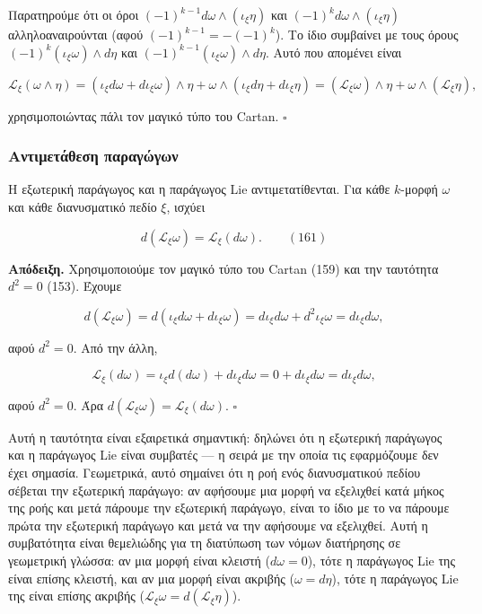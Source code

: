 \documentclass[12pt]{article}
\begin{document}
Παρατηρούμε ότι οι όροι $(-1)^{k-1} d\omega \wedge (\iota_\xi \eta)$ και $(-1)^k d\omega \wedge (\iota_\xi \eta)$ αλληλοαναιρούνται (αφού $(-1)^{k-1} = -(-1)^k$). Το ίδιο συμβαίνει με τους όρους $(-1)^k (\iota_\xi \omega) \wedge d\eta$ και $(-1)^{k-1} (\iota_\xi \omega) \wedge d\eta$. Αυτό που απομένει είναι

\[
\mathcal{L}_\xi (\omega \wedge \eta) = (\iota_\xi d\omega + d\iota_\xi \omega) \wedge \eta + \omega \wedge (\iota_\xi d\eta + d\iota_\xi \eta) = (\mathcal{L}_\xi \omega) \wedge \eta + \omega \wedge (\mathcal{L}_\xi \eta),
\]

χρησιμοποιώντας πάλι τον μαγικό τύπο του Cartan. $\square$

\subsubsection{Αντιμετάθεση παραγώγων}

Η εξωτερική παράγωγος και η παράγωγος Lie αντιμετατίθενται. Για κάθε $k$-μορφή $\omega$ και κάθε διανυσματικό πεδίο $\xi$, ισχύει

\[
d(\mathcal{L}_\xi \omega) = \mathcal{L}_\xi (d\omega). \qquad (161)
\]

\textbf{Απόδειξη.} Χρησιμοποιούμε τον μαγικό τύπο του Cartan (159) και την ταυτότητα $d^2 = 0$ (153). Έχουμε

\[
d(\mathcal{L}_\xi \omega) = d(\iota_\xi d\omega + d\iota_\xi \omega) = d\iota_\xi d\omega + d^2 \iota_\xi \omega = d\iota_\xi d\omega,
\]

αφού $d^2 = 0$. Από την άλλη,

\[
\mathcal{L}_\xi (d\omega) = \iota_\xi d(d\omega) + d\iota_\xi d\omega = 0 + d\iota_\xi d\omega = d\iota_\xi d\omega,
\]

αφού $d^2 = 0$. Άρα $d(\mathcal{L}_\xi \omega) = \mathcal{L}_\xi (d\omega)$. $\square$

Αυτή η ταυτότητα είναι εξαιρετικά σημαντική: δηλώνει ότι η εξωτερική παράγωγος και η παράγωγος Lie είναι συμβατές — η σειρά με την οποία τις εφαρμόζουμε δεν έχει σημασία. Γεωμετρικά, αυτό σημαίνει ότι η ροή ενός διανυσματικού πεδίου σέβεται την εξωτερική παράγωγο: αν αφήσουμε μια μορφή να εξελιχθεί κατά μήκος της ροής και μετά πάρουμε την εξωτερική παράγωγο, είναι το ίδιο με το να πάρουμε πρώτα την εξωτερική παράγωγο και μετά να την αφήσουμε να εξελιχθεί. Αυτή η συμβατότητα είναι θεμελιώδης για τη διατύπωση των νόμων διατήρησης σε γεωμετρική γλώσσα: αν μια μορφή είναι κλειστή ($d\omega = 0$), τότε η παράγωγος Lie της είναι επίσης κλειστή, και αν μια μορφή είναι ακριβής ($\omega = d\eta$), τότε η παράγωγος Lie της είναι επίσης ακριβής ($\mathcal{L}_\xi \omega = d(\mathcal{L}_\xi \eta)$).
\end{document}
